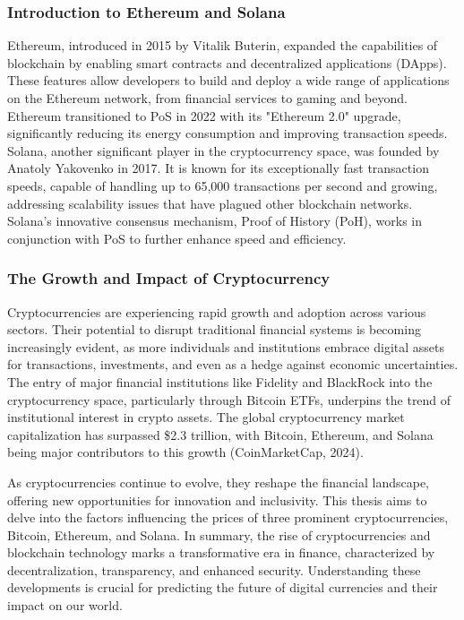\subsubsection{Introduction to Ethereum and Solana}
Ethereum, introduced in 2015 by Vitalik Buterin, expanded the capabilities of blockchain by enabling smart contracts and decentralized applications (DApps). 
These features allow developers to build and deploy a wide range of applications on the Ethereum network, from financial services to gaming and beyond. 
Ethereum transitioned to PoS in 2022 with its "Ethereum 2.0" upgrade, significantly reducing its energy consumption and improving transaction speeds.
Solana, another significant player in the cryptocurrency space, was founded by Anatoly Yakovenko in 2017. It is known for its exceptionally fast transaction 
speeds, capable of handling up to 65,000 transactions per second and growing, addressing scalability issues that have plagued other blockchain networks. 
Solana's innovative consensus mechanism, Proof of History (PoH), works in conjunction with PoS to further enhance speed and efficiency.

\subsubsection{The Growth and Impact of Cryptocurrency}
Cryptocurrencies are experiencing rapid growth and adoption across various sectors. Their potential to disrupt traditional financial systems is becoming 
increasingly evident, as more individuals and institutions embrace digital assets for transactions, investments, and even as a hedge against economic 
uncertainties. The entry of major financial institutions like Fidelity and BlackRock into the cryptocurrency space, particularly through Bitcoin ETFs, 
underpins the trend of institutional interest in crypto assets. The global cryptocurrency market capitalization has surpassed \$2.3 trillion, with Bitcoin, 
Ethereum, and Solana being major contributors to this growth (CoinMarketCap, 2024).

As cryptocurrencies continue to evolve, they reshape the financial landscape, offering new opportunities for innovation and inclusivity. This thesis aims to 
delve into the factors influencing the prices of three prominent cryptocurrencies, Bitcoin, Ethereum, and Solana. 
In summary, the rise of cryptocurrencies and blockchain technology marks a transformative era in finance, characterized by decentralization, transparency, and 
enhanced security. Understanding these developments is crucial for predicting the future of digital currencies and their impact on our world.

